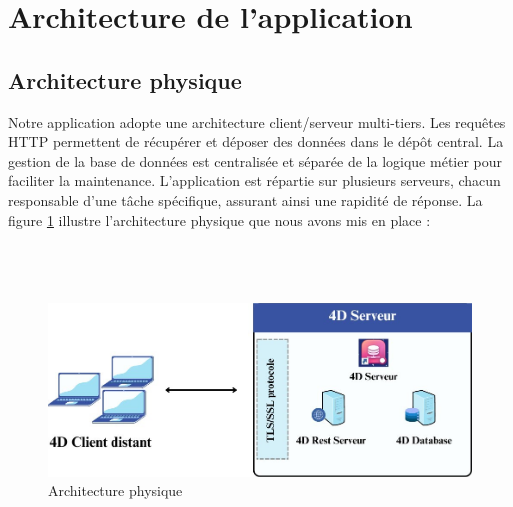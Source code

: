 \section{Architecture de l'application}
\subsection{Architecture physique}
Notre application adopte une architecture client/serveur multi-tiers. 
Les requêtes HTTP permettent de récupérer et déposer des données dans le dépôt 
central. La gestion de la base de données est centralisée et séparée de la 
logique métier pour faciliter la maintenance. L'application est répartie sur 
plusieurs serveurs, chacun responsable d'une tâche spécifique, assurant ainsi 
une rapidité de réponse.
La figure \ref{fig:physiqueArch} illustre l'architecture physique que nous avons mis en place :
\\
\\
\\
\\

\begin{figure}[htbp]
   \centering
   \includegraphics[scale=0.5]{Images/physique.jpg} %
   \caption{Architecture physique}
   \label{fig:physiqueArch}
\end{figure}

